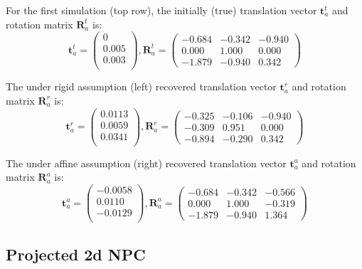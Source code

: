 \documentclass[11pt, a4paper, oneside, twocolumn]{report}
\renewcommand{\b}{\textbf}
\begin{document}
For the first simulation (top row), the initially (true) translation
vector $\b{t}_a^t$ and rotation matrix $\b{R}_a^t$ is:
\begin{equation}
  \b{t}_a^t=
  \begin{pmatrix}
    0 \\
    0.005 \\
    0.003 \\
  \end{pmatrix}
  ,  \b{R}_a^t=
  \begin{pmatrix}
    -0.684 & -0.342 & -0.940 \\
    0.000 & 1.000 & 0.000 \\
    -1.879 & -0.940 & 0.342
  \end{pmatrix}
\end{equation}

The under rigid assumption (left) recovered translation vector
$\b{t}_a^r$ and rotation matrix $\b{R}_a^r$ is:
\begin{equation}
  \b{t}_a^r=
  \begin{pmatrix}
    0.0113 \\
    0.0059 \\
    0.0341 \\
  \end{pmatrix}
  ,  \b{R}_a^r=
  \begin{pmatrix}
    -0.325 & -0.106 & -0.940 \\
    -0.309 & 0.951 & 0.000 \\
    -0.894 & -0.290 & 0.342
  \end{pmatrix}
\end{equation}

The under affine assumption (right) recovered translation vector
$\b{t}_a^a$ and rotation matrix $\b{R}_a^a$ is:
\begin{equation}
  \b{t}_a^a=
  \begin{pmatrix}
    -0.0058 \\
    0.0110 \\
    -0.0129 \\
  \end{pmatrix}
  ,  \b{R}_a^a=
  \begin{pmatrix}
    -0.684 & -0.342 & -0.566 \\
    0.000 & 1.000 & -0.319 \\
    -1.879 & -0.940 & 1.364
  \end{pmatrix}
\end{equation}


\clearpage\subsection{Projected 2d NPC}\label{s:r:2dsim}
\end{document}
